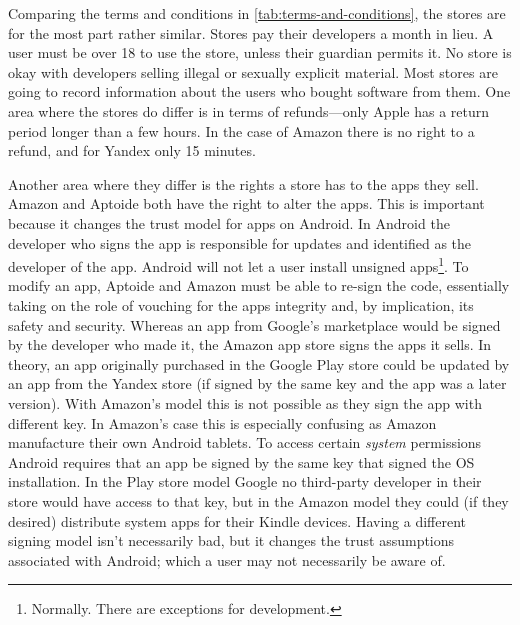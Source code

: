 \documentclass[thesis.tex]{subfiles}
\begin{document}
Comparing the terms and conditions in
\autoref{tab:terms-and-conditions}, the stores are for the most part
rather similar.  Stores pay their developers a month in lieu.  A user
must be over 18 to use the store, unless their guardian permits it.
No store is okay with developers selling illegal or sexually explicit
material.  Most stores are going to record information about the
users who bought software from them.  One area where the stores do
differ is in terms of refunds---only Apple has a return period longer
than a few hours.  In the case of Amazon there is no right to a
refund, and for Yandex only 15 minutes.

Another area where they differ is the rights a store has to the apps they sell.
Amazon and Aptoide both have the right to alter the apps. This is important
because it changes the trust model for apps on Android. In Android the developer
who signs the app is responsible for updates and identified as the developer of
the app. Android will not let a user install unsigned apps\footnote{Normally.
There are exceptions for development.}. To modify an app, Aptoide and Amazon
must be able to re-sign the code, essentially taking on the role of vouching for
the apps integrity and, by implication, its safety and security. Whereas an app
from Google's marketplace would be signed by the developer who made it, the
Amazon app store signs the apps it sells. In theory, an app originally purchased
in the Google Play store could be updated by an app from the Yandex store (if
signed by the same key and the app was a later version). With Amazon's model
this is not possible as they sign the app with different key. In Amazon's case
this is especially confusing as Amazon manufacture their own Android tablets. To
access certain \emph{system} permissions Android requires that an app be signed
by the same key that signed the OS installation. In the Play store model Google
no third-party developer in their store would have access to that key, but in
the Amazon model they could (if they desired) distribute system apps for their
Kindle devices. Having a different signing model isn't necessarily bad, but it
changes the trust assumptions associated with Android; which a user may not
necessarily be aware of.

\end{document}

